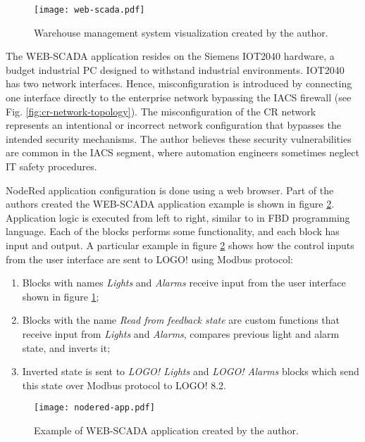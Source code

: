\begin{figure}[H]
	\centering
	\texttt{[image: web-scada.pdf]}
	\caption{Warehouse management system visualization created by the author.}
	\label{fig:web-scada}
\end{figure}

The WEB-SCADA application resides on the Siemens IOT2040 hardware, a budget industrial PC designed to withstand industrial environments. IOT2040 has two network interfaces. Hence, misconfiguration is introduced by connecting one interface directly to the enterprise network bypassing the IACS firewall (see Fig. \ref{fig:cr-network-topology}). The misconfiguration of the CR network represents an intentional or incorrect network configuration that bypasses the intended security mechanisms. The author believes these security vulnerabilities are common in the IACS segment, where automation engineers sometimes neglect IT safety procedures.

NodeRed application configuration is done using a web browser. Part of the authors created the WEB-SCADA application example is shown in figure \ref{fig:nodered-app}. Application logic is executed from left to right, similar to in FBD programming language. Each of the blocks performs some functionality, and each block has input and output. A particular example in figure \ref{fig:nodered-app} shows how the control inputs from the user interface are sent to LOGO! using Modbus protocol:

\begin{enumerate}
	\item Blocks with names \textit{Lights} and \textit{Alarms} receive input from the user interface shown in figure \ref{fig:web-scada};
	
	\item Blocks with the name \textit{Read from feedback state} are custom functions that receive input from \textit{Lights} and \textit{Alarms}, compares previous light and alarm state, and inverts it;
	
	\item Inverted state is sent to \textit{LOGO! Lights} and \textit{LOGO! Alarms} blocks which send this state over Modbus protocol to LOGO! 8.2.
\end{enumerate}



\begin{figure}[H]
	\centering
	\texttt{[image: nodered-app.pdf]}
	\caption{Example of WEB-SCADA application created by the author.}
	\label{fig:nodered-app}
\end{figure}


